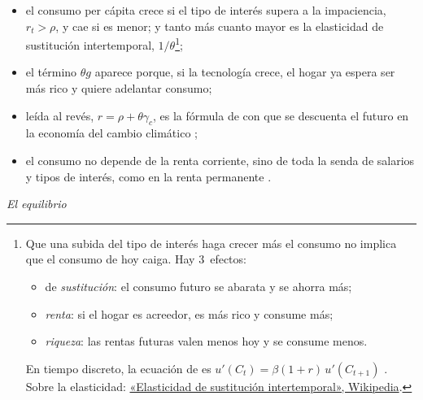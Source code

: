 \documentclass[11pt]{article}
\begin{document}
\begin{itemize}
  \begin{itemize}
  \item el consumo per cápita crece si el tipo de interés supera a la impaciencia, $r_t>\rho$, y cae si es menor; y tanto más cuanto mayor es la elasticidad de sustitución intertemporal, $1/\theta$\footnote{Que una subida del tipo de interés haga crecer más el consumo no implica que el consumo de hoy caiga. Hay 3~efectos\nocite{ObstfeldRogoff1996Foundations}:
\begin{itemize}
\item de \emph{sustitución}: el consumo futuro se abarata y se ahorra más;
\item \emph{renta}: si el hogar es acreedor, es más rico y consume más;
\item \emph{riqueza}: las rentas futuras valen menos hoy y se consume menos.
\end{itemize}
En tiempo discreto, la ecuación de  es $u'(C_t)=\beta(1+r)\,u'(C_{t+1})$ . Sobre la elasticidad: \href{https://es.wikipedia.org/wiki/Elasticidad_de_sustituci\%C3\%B3n_intertemporal}{«Elasticidad de sustitución intertemporal», Wikipedia}.};
  \item el término $\theta g$ aparece porque, si la tecnología crece, el hogar ya espera ser más rico y quiere adelantar consumo;
  \item leída al revés, $r=\rho+\theta\gamma_c$, es la fórmula de  con que se descuenta el futuro en la economía del cambio climático ;
  \item el consumo no depende de la renta corriente, sino de toda la senda de salarios y tipos de interés, como en la renta permanente .
  \end{itemize}
\end{itemize}

\hspace*{3.6em}\emph{El equilibrio}
\end{document}
